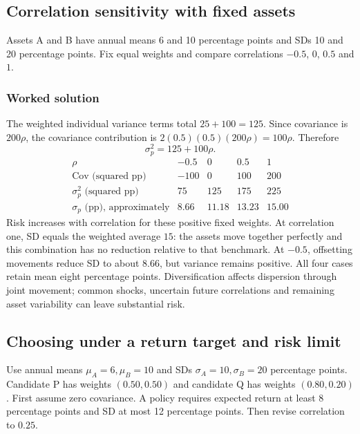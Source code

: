 \subsection{Correlation sensitivity with fixed assets}\label{prob:sec:advanced0}
Assets A and B have annual means 6 and 10 percentage points and SDs 10 and 20 percentage points. Fix equal weights and compare correlations $-0.5$, $0$, $0.5$ and $1$.
\subsubsection*{Worked solution}\label{sol:sec:advanced0}
The weighted individual variance terms total $25+100=125$. Since covariance is $200\rho$, the covariance contribution is $2(0.5)(0.5)(200\rho)=100\rho$. Therefore
\[
\sigma_p^2=125+100\rho.
\]
\[
\begin{array}{c|rrrr}
\rho&-0.5&0&0.5&1\\ \hline
\operatorname{Cov}\text{ (squared pp)}&-100&0&100&200\\
\sigma_p^2\text{ (squared pp)}&75&125&175&225\\
\sigma_p\text{ (pp), approximately}&8.66&11.18&13.23&15.00
\end{array}
\]
Risk increases with correlation for these positive fixed weights. At correlation one, SD equals the weighted average $15$: the assets move together perfectly and this combination has no reduction relative to that benchmark. At $-0.5$, offsetting movements reduce SD to about $8.66$, but variance remains positive. All four cases retain mean eight percentage points. Diversification affects dispersion through joint movement; common shocks, uncertain future correlations and remaining asset variability can leave substantial risk.


\subsection{Choosing under a return target and risk limit}\label{prob:sec:advanced1}
Use annual means $\mu_A=6,\mu_B=10$ and SDs $\sigma_A=10,\sigma_B=20$ percentage points. Candidate P has weights $(0.50,0.50)$ and candidate Q has weights $(0.80,0.20)$. First assume zero covariance. A policy requires expected return at least 8 percentage points and SD at most 12 percentage points. Then revise correlation to $0.25$.
